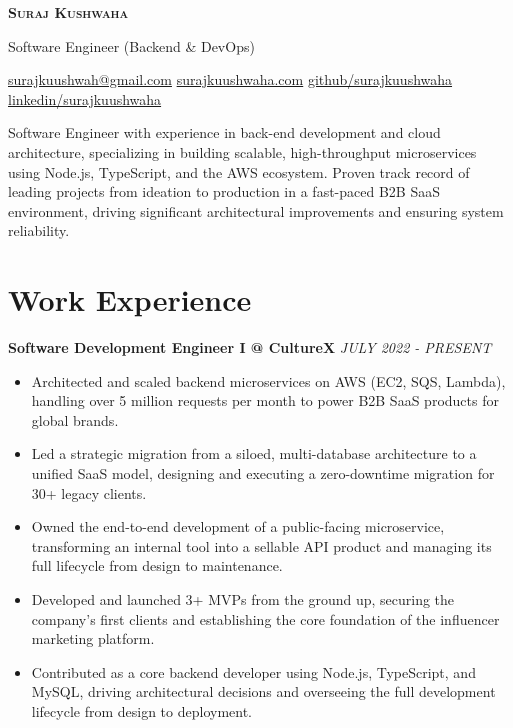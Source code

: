 



\begin{center}
    {\Huge\scshape\bfseries Suraj Kushwaha} %
    \vspace{1ex}
    
    {\large Software Engineer (Backend \& DevOps)} %

    
\end{center}

    \href{mailto:surajkuushwah@gmail.com}{surajkuushwah@gmail.com} \quad\textbar\quad
    \href{https://surajkuushwaha.com}{surajkuushwaha.com} \quad\textbar\quad
    \href{https://github.com/surajkuushwaha}{github/surajkuushwaha} \quad\textbar\quad
    \href{https://linkedin.com/in/surajkuushwaha}{linkedin/surajkuushwaha}

\vspace{2ex}
Software Engineer with experience in back-end development and cloud architecture, specializing in building scalable, high-throughput microservices using Node.js, TypeScript, and the AWS ecosystem. Proven track record of leading projects from ideation to production in a fast-paced B2B SaaS environment, driving significant architectural improvements and ensuring system reliability.

\section*{Work Experience}

\textbf{Software Development Engineer I @ CultureX} \hfill \textit{JULY 2022 - PRESENT}
\begin{itemize}
    \item Architected and scaled backend microservices on AWS (EC2, SQS, Lambda), handling over 5 million requests per month to power B2B SaaS products for global brands.
    \item Led a strategic migration from a siloed, multi-database architecture to a unified SaaS model, designing and executing a zero-downtime migration for 30+ legacy clients.
    \item Owned the end-to-end development of a public-facing microservice, transforming an internal tool into a sellable API product and managing its full lifecycle from design to maintenance.
    \item Developed and launched 3+ MVPs from the ground up, securing the company’s first clients and establishing the core foundation of the influencer marketing platform.
    \item Contributed as a core backend developer using Node.js, TypeScript, and MySQL, driving architectural decisions and overseeing the full development lifecycle from design to deployment.
\end{itemize}

